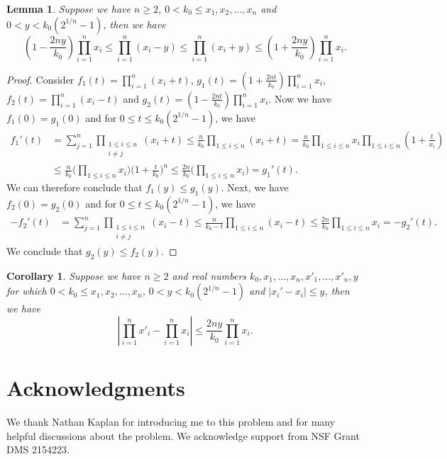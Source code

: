 \documentclass[12pt]{amsart}
\newtheorem{corollary}{Corollary}[theorem]
\newtheorem{lemma}[theorem]{Lemma}
\theoremstyle{definition}
\begin{document}
\begin{lemma}\label{Lem: bound product}
Suppose we have $n\geq 2$, $0<k_0\leq x_1,x_2,\dots,x_n$ and $0<y<k_0(2^{1/n}-1)$, then we have
\[ 
\left(1-\frac{2ny}{k_0} \right) 
\prod_{i=1}^n x_i   
\leq \prod_{i=1}^n(x_i-y)
\leq \prod_{i=1}^n(x_i+y)
\leq  \left(1+\frac{2ny}{k_0}\right) 
\prod_{i=1}^n x_i.
\]
\end{lemma}
\begin{proof}
Consider $f_1(t)=\prod_{i=1}^n(x_i+t)$,
$g_1(t)=(1+\frac{2nt}{k_0}) \prod_{i=1}^n x_i$,
$f_2(t)=\prod_{i=1}^n(x_i-t)$ and
$g_2(t)=(1-\frac{2nt}{k_0}) \prod_{i=1}^n x_i$. Now we have $f_1(0)=g_1(0)$ and for $0\leq t\leq k_0(2^{1/n}-1)$, we have
\begin{align*}
f_1'(t)
&=\sum_{j=1}^{n}\prod_{\substack{1\leq i\leq n\\ i\neq j}} (x_i+t)
\leq \frac{n}{k_0} \prod_{1\leq i\leq n} (x_i+t)
= \frac{n}{k_0} \prod_{1\leq i\leq n} x_i \prod_{1\leq i\leq n} (1+\frac{t}{x_i} )\\
&\leq \frac{n}{k_0} \Big(\prod_{1\leq i\leq n} x_i \Big)  \Big(1+\frac{t}{k_0} \Big)^n
\leq \frac{2n}{k_0} \Big(\prod_{1\leq i\leq n} x_i \Big)  =g_1'(t).
\end{align*}
We can therefore conclude that $f_1(y)\leq g_1(y)$. Next, we have $f_2(0)=g_2(0)$ and for $0\leq t\leq k_0(2^{1/n}-1)$, we have
\begin{align*}
-f_2'(t)
&=\sum_{j=1}^{n}\prod_{\substack{1\leq i\leq n\\ i\neq j}} (x_i-t)
\leq \frac{n}{k_0-t} \prod_{1\leq i\leq n} (x_i-t)
\leq \frac{2n}{k_0} \prod_{1\leq i\leq n} x_i  =-g_2'(t).
\end{align*}
We conclude that $g_2(y)\leq f_2(y)$.
\end{proof}
\begin{corollary}\label{Cor: estimate product}
Suppose we have $n\geq 2$ and real numbers $k_0,x_1,\dots,x_n,x'_1,\dots,x'_n,y$ for which $0<k_0\leq x_1,x_2,\dots,x_n$, $0<y<k_0(2^{1/n}-1)$ and $|x_i'-x_i|\leq y$, then we have
\[\left|\prod_{i=1}^n x'_i -\prod_{i=1}^n x_i\right|\leq \frac{2ny}{k_0} \prod_{i=1}^n x_i.\]
\end{corollary}




\section*{Acknowledgments}
We thank Nathan Kaplan for introducing me to this problem and for many helpful discussions about the problem.
We acknowledge support from NSF Grant DMS 2154223.






\end{document}

